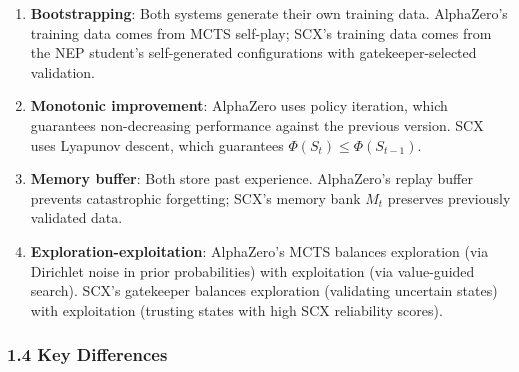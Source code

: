 \documentclass[
  12pt,
]{ctexart}
\begin{document}
\begin{enumerate}
\def\labelenumi{\arabic{enumi}.}
\item
  \textbf{Bootstrapping}: Both systems generate their own training data.
  AlphaZero's training data comes from MCTS self-play; SCX's training
  data comes from the NEP student's self-generated configurations with
  gatekeeper-selected validation.
\item
  \textbf{Monotonic improvement}: AlphaZero uses policy iteration, which
  guarantees non-decreasing performance against the previous version.
  SCX uses Lyapunov descent, which guarantees
  \(\Phi(S_t) \leq \Phi(S_{t-1})\).
\item
  \textbf{Memory buffer}: Both store past experience. AlphaZero's replay
  buffer prevents catastrophic forgetting; SCX's memory bank \(M_t\)
  preserves previously validated data.
\item
  \textbf{Exploration-exploitation}: AlphaZero's MCTS balances
  exploration (via Dirichlet noise in prior probabilities) with
  exploitation (via value-guided search). SCX's gatekeeper balances
  exploration (validating uncertain states) with exploitation (trusting
  states with high SCX reliability scores).
\end{enumerate}

\subsubsection{1.4 Key Differences}\label{key-differences}
\end{document}
